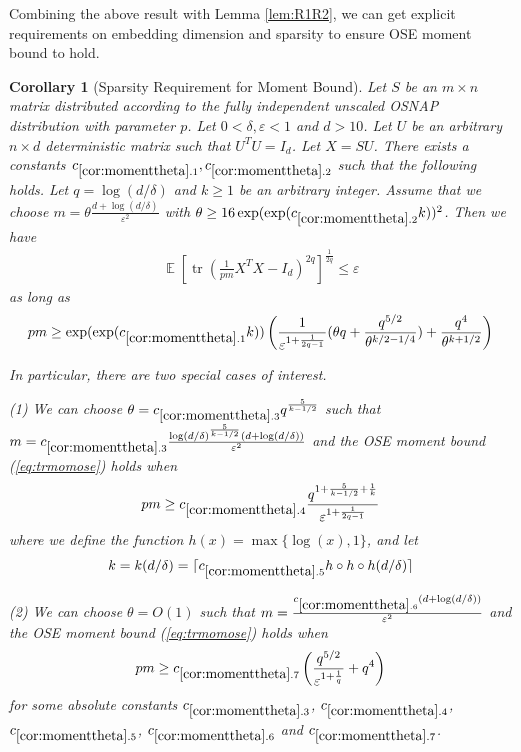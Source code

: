 \documentclass[11pt]{amsart}
\numberwithin{equation}{section}
\numberwithin{equation}{section}
\DeclareMathOperator{\E}{\mathbb{E}}
\DeclareMathOperator*{\tr}{tr}
\newtheorem{corollary}[theorem]{Corollary}
\begin{document}
Combining the above result with Lemma \ref{lem:R1R2}, we can get explicit requirements on embedding dimension and sparsity to ensure OSE moment bound to hold.

\begin{corollary}[Sparsity Requirement for Moment Bound]\label{cor:momenttheta}
Let $S$ be an $m \times n$ matrix distributed according to the fully independent unscaled OSNAP distribution with parameter $p$. Let $0 < \delta,  \varepsilon < 1$ and $d>10$. Let $U$ be an arbitrary $n \times d$ deterministic matrix such that $U^TU=I_d$.
Let $X=SU$.
There exists a constants $c_{\ref{cor:momenttheta}.1},c_{\ref{cor:momenttheta}.2}$ such that the following holds. Let $q=\log(d/\delta)$ and $k \ge 1$ be an arbitrary integer.
Assume that we choose $m=\theta\frac{d+\log(d/\delta)}{\varepsilon^2}$ with $\theta\ge 16\exp(\exp(c_{\ref{cor:momenttheta}.2}k))^2$. Then we have
\begin{equation}\label{eq:trmomose}
    \begin{aligned}
    \E[\tr(\frac{1}{pm}X^TX - I_d)^{2q}]^\frac{1}{2q} \leq  \varepsilon
\end{aligned}
\end{equation}
as long as
\begin{align*}
    \begin{aligned}
    {pm } \ge {\exp(\exp(c_{\ref{cor:momenttheta}.1}k))}\left(\frac{1}{\varepsilon^{1+\frac{1}{2q-1}}}(\theta q+\frac{q^{5/2}}{\theta^{k/2-1/4}})+\frac{ q^{4}}{\theta^{k+1/2}}\right)
\end{aligned}
\end{align*}

In particular, there are two special cases of interest.

(1) We can choose $\theta=c_{\ref{cor:momenttheta}.3} q^{\frac{5}{k-1/2}}$ such that $m=c_{\ref{cor:momenttheta}.3}\frac{\log(d/\delta)^{\frac{5}{k-1/2}}(d+\log(d/\delta))}{\varepsilon^2}$ and the OSE moment bound (\ref{eq:trmomose}) holds when
\begin{align*}
     pm \ge c_{\ref{cor:momenttheta}.4} \frac{q^{1+{\frac{5}{k - 1/2} + \frac{1}{k}}}}{\varepsilon^{1+\frac{1}{2q-1}}}
\end{align*}
where we define the function $h(x)=\max\{\log(x),1\}$, and let
\begin{align*}
    k=k(d/\delta)=\lceil c_{\ref{cor:momenttheta}.5} h \circ h \circ h (d/\delta)\rceil
\end{align*}

(2) We can choose $\theta={O(1)}$ such that $m=\frac{c_{\ref{cor:momenttheta}.6}(d+\log(d/\delta))}{\varepsilon^2}$ and the OSE moment bound (\ref{eq:trmomose}) holds 
when 
\begin{align*}
     pm \ge c_{\ref{cor:momenttheta}.7}\left(\frac{q^{5/2}}{\varepsilon^{1+\frac{1}{q}}}+q^4\right)
\end{align*}
for some absolute constants $c_{\ref{cor:momenttheta}.3}$, $c_{\ref{cor:momenttheta}.4}$, $c_{\ref{cor:momenttheta}.5}$, $c_{\ref{cor:momenttheta}.6}$ and $c_{\ref{cor:momenttheta}.7}$.
\end{corollary}
\end{document}
